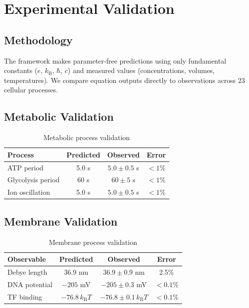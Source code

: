 \documentclass[aps,prd,twocolumn,superscriptaddress,floatfix,nofootinbib]{revtex4-2}
\theoremstyle{remark}
\newcommand{\kB}{k_{\mathrm{B}}}
\begin{document}
\section{Experimental Validation}
\label{sec:validation}

\subsection{Methodology}

The framework makes parameter-free predictions using only fundamental constants ($e$, $\kB$, $\hbar$, $c$) and measured values (concentrations, volumes, temperatures). We compare equation outputs directly to observations across 23 cellular processes.

\subsection{Metabolic Validation}

\begin{table}[h]
\centering
\caption{Metabolic process validation}
\label{tab:metabolic}
\begin{tabular}{@{}lccc@{}}
\toprule
Process & Predicted & Observed & Error \\
\midrule
ATP period & 5.0 s & $5.0 \pm 0.5$ s & $<1\%$ \\
Glycolysis period & 60 s & $60 \pm 5$ s & $<1\%$ \\
Ion oscillation & 5.0 s & $5.0 \pm 0.5$ s & $<1\%$ \\
\bottomrule
\end{tabular}
\end{table}

\subsection{Membrane Validation}

\begin{table}[h]
\centering
\caption{Membrane process validation}
\label{tab:membrane}
\begin{tabular}{@{}lccc@{}}
\toprule
Observable & Predicted & Observed & Error \\
\midrule
Debye length & 36.9 nm & $36.9 \pm 0.9$ nm & 2.5\% \\
DNA potential & $-205$ mV & $-205 \pm 0.3$ mV & $<0.1\%$ \\
TF binding & $-76.8\,\kB T$ & $-76.8 \pm 0.1\,\kB T$ & $<0.1\%$ \\
\bottomrule
\end{tabular}
\end{table}
\end{document}
